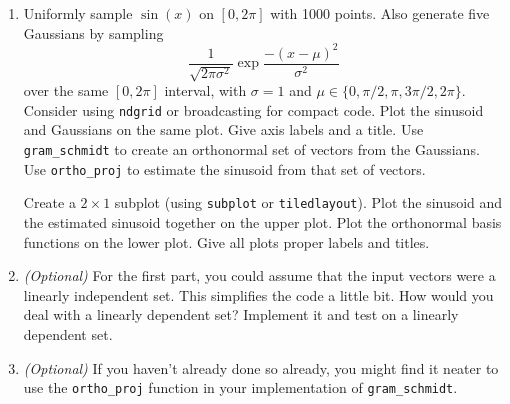 \documentclass{article}
\begin{document}
\begin{enumerate}
\begin{enumerate}
			\clearpage
			\item Uniformly sample $\sin(x)$ on $[0,2\pi]$ with 1000 points. Also generate five Gaussians by sampling
			\begin{equation*}
				\frac{1}{\sqrt{2\pi\sigma^2}}\exp\frac{-(x-\mu)^2}{\sigma^2}
			\end{equation*}
			over the same $[0,2\pi]$ interval, with $\sigma=1$ and $\mu\in\{0,\pi/2,\pi,3\pi/2,2\pi\}$. Consider using \lstinline|ndgrid| or broadcasting for compact code. Plot the sinusoid and Gaussians on the same plot. Give axis labels and a title. Use \lstinline|gram_schmidt| to create an orthonormal set of vectors from the Gaussians. Use \lstinline|ortho_proj| to estimate the sinusoid from that set of vectors.
			
			Create a $2\times 1$ subplot (using \lstinline|subplot| or \lstinline|tiledlayout|). Plot the sinusoid and the estimated sinusoid together on the upper plot. Plot the orthonormal basis functions on the lower plot. Give all plots proper labels and titles.
			
			\item \textit{(Optional)} For the first part, you could assume that the input vectors were a linearly independent set. This simplifies the code a little bit. How would you deal with a linearly dependent set? Implement it and test on a linearly dependent set.
			
			\item \textit{(Optional)} If you haven't already done so already, you might find it neater to use the \lstinline|ortho_proj| function in your implementation of \lstinline|gram_schmidt|.
		\end{enumerate}
	\end{enumerate}
	
\end{document}
